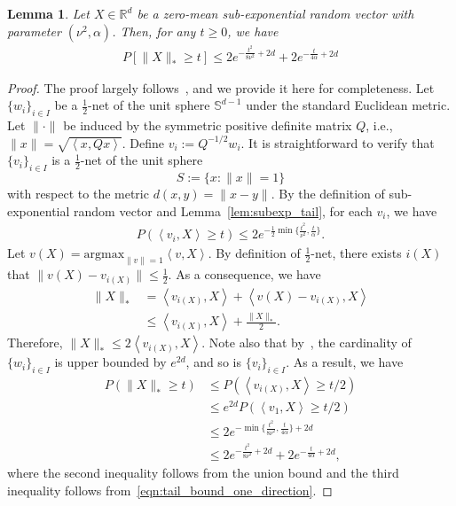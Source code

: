 \documentclass[11pt,twoside]{article}
\numberwithin{equation}{section}
\newcommand{\RR}{\mathbb{R}}
\newcommand{\1}{\mathbf{1}}
\newcommand{\argmax}{\text{argmax}}
\newcommand{\dotp}[1]{\left\langle #1\right\rangle}
\newtheorem{lemma}[theorem]{Lemma}
\theoremstyle{remark}
\theoremstyle{plain}
\begin{document}
\begin{lemma}\label{lem:norm_subGaussian}
	Let $X \in \RR^d$ be a zero-mean sub-exponential random vector with parameter $(\nu^2, \alpha)$. Then, for any $t \ge 0$, we have
	\begin{align*}
		P[\|X\|_*\ge t] \le 2 e^{-\frac{t^2}{8\nu^2} + 2d} + 2 e^{-\frac{t}{4\alpha} + 2d}
	\end{align*}
\end{lemma}
\begin{proof}
	The proof largely follows~\cite[Lemma 1]{jin2019short}, and we provide it here for completeness. Let $\{w_i\}_{i \in I}$ be a $\frac{1}{2}$-net of the unit sphere $\mathbb{S}^{d-1}$ under the standard Euclidean metric. Let $\| \cdot\|$ be induced by the symmetric positive definite matrix $Q$, i.e., $\|x\| = \sqrt{\dotp{x,Qx}}$. Define $v_i := Q^{-1/2} w_i$. It is straightforward to verify that \(\{v_i\}_{i \in I}\) is a \(\frac{1}{2}\)-net of the unit sphere
	\[
	S := \{x : \|x\| = 1\}
	\]
	with respect to the metric \(d(x,y) = \|x-y\|\). By the definition of sub-exponential random vector and Lemma~\ref{lem:subexp_tail}, for each $v_i$, we have
	\begin{align}\label{eqn:tail_bound_one_direction}
		P(\dotp{ v_i,  X} \ge t) \le 2e^{-\frac{1}{2} \min\{\frac{t^2}{\nu^2}, \frac{t}{\alpha}\}}.
	\end{align}
	Let $v(X) = \argmax_{\|v\| =1} \dotp{v,X}$. By definition of $\frac{1}{2}$-net, there exists $i(X)$  that $\|v(X) - v_{i(X)}\| \le \frac{1}{2}.$ As a consequence, we have 
	\begin{align*}
		\|X\|_*& =  \dotp{v_{i(X)}, X} + \dotp{v(X) - v_{i(X)}, X} \\
		& \le \dotp{v_{i(X)}, X}  + \frac{\|X\|_*}{2}.
	\end{align*} 
	Therefore,  $\|X\|_* \le 2 \dotp{v_{i(X)}, X}$. Note also that by~\cite[Lemma 5.2]{vershynin2010introduction}, the cardinality of $\{w_i\}_{i \in I}$  is upper bounded by $e^{2d}$, and so is $\{v_i\}_{i \in I}$. As a result, we have 
	\begin{align*}
		P(\|X\|_* \ge t) &\le P( \dotp{v_{i(X)}, X} \ge t/2)\\
		&\le e^{2d} P(\dotp{v_1, X} \ge t/2)\\
		&\le 2e^{ - \min\{\frac{t^2}{8\nu^2}, \frac{t}{4\alpha}\} + 2d} \\
		&\le 2e^{ - \frac{t^2}{8\nu^2}+ 2d} + 2e^{ - \frac{t}{4\alpha}+ 2d},
	\end{align*}
	where the second inequality follows from the union bound and the third inequality follows from~\eqref{eqn:tail_bound_one_direction}.
\end{proof}
\end{document}
